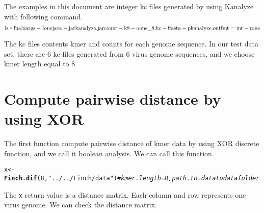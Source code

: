 \documentclass{article}\usepackage[]{graphicx}\usepackage[]{color}
\makeatletter
\newcommand{\hlnum}[1]{\textcolor[rgb]{0.686,0.059,0.569}{#1}}%
\newcommand{\hlstr}[1]{\textcolor[rgb]{0.192,0.494,0.8}{#1}}%
\newcommand{\hlcom}[1]{\textcolor[rgb]{0.678,0.584,0.686}{\textit{#1}}}%
\newcommand{\hlstd}[1]{\textcolor[rgb]{0.345,0.345,0.345}{#1}}%
\newcommand{\hlkwb}[1]{\textcolor[rgb]{0.69,0.353,0.396}{#1}}%
\newcommand{\hlkwd}[1]{\textcolor[rgb]{0.737,0.353,0.396}{\textbf{#1}}}%
\newenvironment{kframe}{%
 \def\at@end@of@kframe{}%
 \ifinner\ifhmode%
  \def\at@end@of@kframe{\end{minipage}}%
  \begin{minipage}{\columnwidth}%
 \fi\fi%
 \def\FrameCommand##1{\hskip\@totalleftmargin \hskip-\fboxsep
 \colorbox{shadecolor}{##1}\hskip-\fboxsep
     \hskip-\linewidth \hskip-\@totalleftmargin \hskip\columnwidth}%
 \MakeFramed {\advance\hsize-\width
   \@totalleftmargin\z@ \linewidth\hsize
   \@setminipage}}%
 {\par\unskip\endMakeFramed%
 \at@end@of@kframe}
\newenvironment{knitrout}{}{} %
\makeatother
\begin{document}
The examples in this document are integer kc files generated by using Kanalyze\cite{Audano:2014aa} with following command.
\[{\rm{ls *fna | xargs  - I one java  - jar kanalyze.jar count  - k 8  - o one\_8.kc  - f fasta  - p kanalyze.outfmt = int  - r one}}\]

The kc files contents kmer and counts for each genome sequence. In our test data set, there are 6 kc files generated from 6 virus genome sequences, and we choose kmer length equal to 8

\section{Compute pairwise distance by using XOR}
\label{Finch.dif}

The first function  compute pairwise distance of kmer data by using XOR discrete function, and we call it boolean analysis. We can call this function.

\begin{knitrout}
\color{fgcolor}\begin{kframe}
\begin{alltt}
\hlstd{x} \hlkwb{<-} \hlkwd{Finch.dif}\hlstd{(}\hlnum{8}\hlstd{,}\hlstr{"../../Finch/data"}\hlstd{)} \hlcom{#kmer.length = 8, path.to.data to data folder}
\end{alltt}
\end{kframe}
\end{knitrout}

The \texttt{x} return value is a distance matrix. Each column and row represents one virus genome. We can check the distance matrix.
\end{document}
